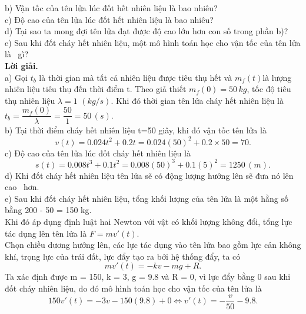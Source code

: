 b) Vận tốc của tên lửa lúc đốt hết nhiên liệu là bao nhiêu?\\
c) Độ cao của tên lửa lúc đốt hết nhiên liệu là bao nhiêu?\\
d) Tại sao ta mong đợi tên lửa đạt được độ cao lớn hơn con số trong phần b)?\\
e) Sau khi đốt cháy hết nhiên liệu, một mô hình toán học cho vận tốc của tên lửa là~ gì?\\
\textbf{Lời giải.}\\
a) Gọi $t_b$ là thời gian mà tất cả nhiên liệu được tiêu thụ hết và ${{m}_{f}}(t)$là lượng nhiên liệu tiêu thụ đến thời điểm t. Theo giả thiết ${{m}_{f}}(0)=50\,kg$, tốc độ tiêu thụ nhiên liệu $\lambda =1\,\,(kg/s)$. Khi đó thời gian tên lửa cháy hết nhiên liệu là ${{t}_{b}}=\dfrac{{{m}_{f}}(0)}{\lambda }=\dfrac{50}{1}=50\,(s).$\\
b) Tại thời điểm cháy hết nhiên liệu t=50 giây, khi đó vận tốc tên lửa là
$$v(t)=0.024{{t}^{2}}+0.2t=0.024{{(50)}^{2}}+0.2\times 50=70.$$
c) Độ cao của tên lửa lúc đốt cháy hết nhiên liệu là 
$$s(t)=0.008{{t}^{3}}+0.1{{t}^{2}}=0.008{{(50)}^{3}}+0.1{{(5)}^{2}}=1250\,(m).$$
d) Khi đốt cháy hết nhiên liệu tên lửa sẽ có động lượng hướng lên sẽ đưa nó lên cao~ hơn.\\
e) Sau khi đốt cháy hết nhiên liệu, tổng khối lượng của tên lửa là một hằng số bằng 200 - 50 = 150 kg. \\
Khi đó áp dụng định luật hai Newton với vật có khối lượng không đổi, tổng lực tác dụng lên tên lửa là $F=mv'(t)$.\\
Chọn chiều dương hướng lên, các lực tác dụng vào tên lửa bao gồm lực cản không 
khí, trọng lực của trái đất, lực đẩy tạo ra bởi hệ thống đẩy, ta có
$$mv'(t)=-kv-mg+R.$$
Ta xác định được m = 150, k = 3, g = 9.8  và R = 0, vì lực đẩy bằng 0 sau khi đốt cháy nhiên liệu, do đó mô hình toán học cho vận tốc của tên lửa là 
$$150v'(t)=-3v-150(9.8)+0\Leftrightarrow v'(t)=-\dfrac{v}{50}-9.8.$$
